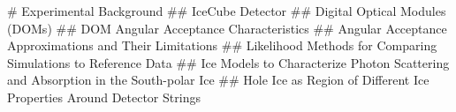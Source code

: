 
# Experimental Background
## IceCube Detector
## Digital Optical Modules (DOMs)
## DOM Angular Acceptance Characteristics
## Angular Acceptance Approximations and Their Limitations
## Likelihood Methods for Comparing Simulations to Reference Data
## Ice Models to Characterize Photon Scattering and Absorption in the South-polar Ice
## Hole Ice as Region of Different Ice Properties Around Detector Strings
